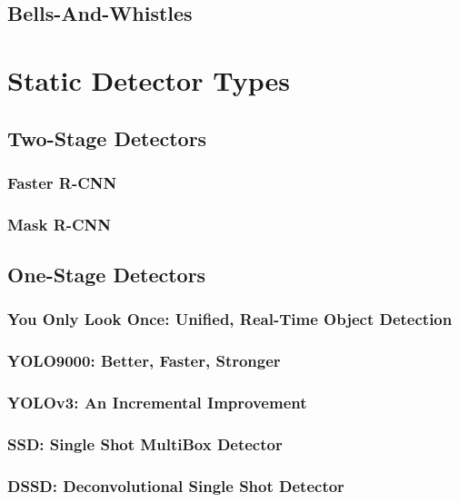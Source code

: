 \documentclass[12pt, oneside]{article}
\begin{document}
\subsection{Bells-And-Whistles}

\section{Static Detector Types}

\vfill

\subsection{Two-Stage Detectors}

\subsubsection{Faster R-CNN}
\subsubsection{Mask R-CNN}

\subsection{One-Stage Detectors}

\subsubsection{You Only Look Once: Unified, Real-Time Object Detection}

\vfill

\subsubsection{YOLO9000: Better, Faster, Stronger}

\vfill

\subsubsection{YOLOv3: An Incremental Improvement}
\subsubsection{SSD: Single Shot MultiBox Detector}

\vfill

\subsubsection{DSSD: Deconvolutional Single Shot Detector}

\vfill
\end{document}
